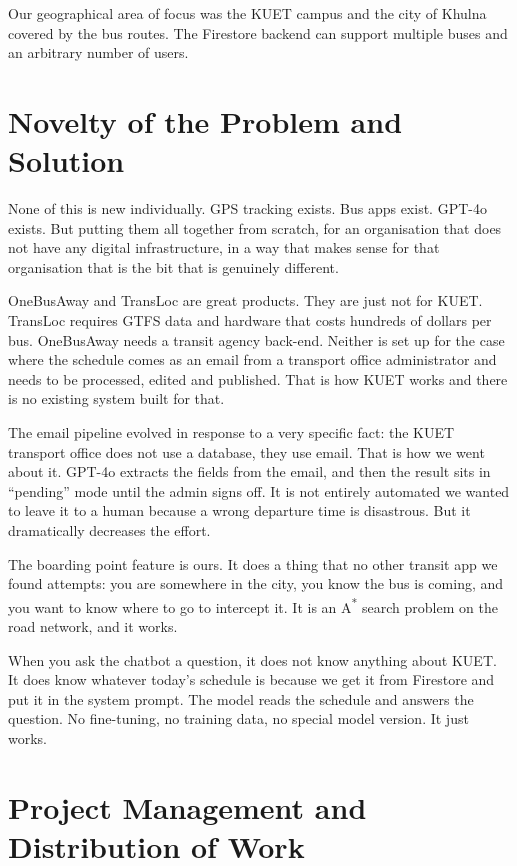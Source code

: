 \documentclass[12pt,a4paper]{report}
\begin{document}
Our geographical area of focus was the KUET campus and the city of Khulna covered by the bus routes. The Firestore backend can support multiple buses and an arbitrary number of users.

\section{Novelty of the Problem and Solution}

None of this is new individually. GPS tracking exists. Bus apps exist. GPT-4o exists. But putting them all together from scratch, for an organisation that does not have any digital infrastructure, in a way that makes sense for that organisation that is the bit that is genuinely different.

OneBusAway and TransLoc are great products. They are just not for KUET. TransLoc requires GTFS data and hardware that costs hundreds of dollars per bus. OneBusAway needs a transit agency back-end. Neither is set up for the case where the schedule comes as an email from a transport office administrator and needs to be processed, edited and published. That is how KUET works and there is no existing system built for that.

The email pipeline evolved in response to a very specific fact: the KUET transport office does not use a database, they use email. That is how we went about it. GPT-4o extracts the fields from the email, and then the result sits in ``pending'' mode until the admin signs off. It is not entirely automated we wanted to leave it to a human because a wrong departure time is disastrous. But it dramatically decreases the effort.

The boarding point feature is ours. It does a thing that no other transit app we found attempts: you are somewhere in the city, you know the bus is coming, and you want to know where to go to intercept it. It is an A\textsuperscript{*} search problem on the road network, and it works.

When you ask the chatbot a question, it does not know anything about KUET. It does know whatever today's schedule is because we get it from Firestore and put it in the system prompt. The model reads the schedule and answers the question. No fine-tuning, no training data, no special model version. It just works.

\section{Project Management and Distribution of Work}
\end{document}
